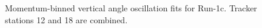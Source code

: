 \begin{figure}[]
\caption{Momentum-binned vertical angle oscillation fits for Run-1c. Tracker stations 12 and 18 are combined.}
\label{fig:Run1cMomBinnedFits}
\end{figure}
\clearpage


